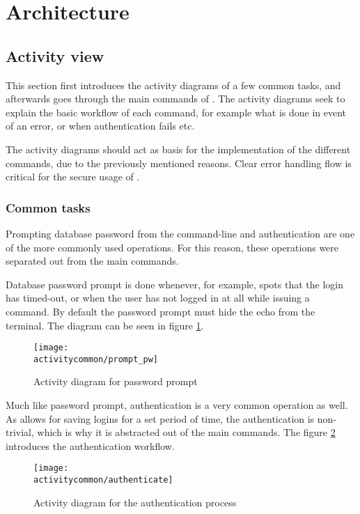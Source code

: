 \section{Architecture}

\subsection{Activity view}

This section first introduces the activity diagrams of a few common tasks, and
afterwards goes through the main commands of \pman. The activity
diagrams seek to explain the basic workflow of each command, for example what
is done in event of an error, or when authentication fails etc.

The activity diagrams should act as basis for the implementation of the different
commands, due to the previously mentioned reasons. Clear error handling flow is
critical for the secure usage of \pman.

\subsubsection{Common tasks}

Prompting database password from the command-line and authentication are one of
the more commonly used operations. For this reason, these operations were separated
out from the main commands.

Database password prompt is done whenever, for example, \pman spots that
the login has timed-out, or when the user has not logged in at all while issuing
a command. By default the password prompt must hide the echo from the terminal.
The diagram can be seen in figure \ref{dia:prompt_pw}.

\begin{figure}[H]
    \centering
    \texttt{[image: \\activitycommon/prompt\_pw]}
    \caption{Activity diagram for password prompt}
    \label{dia:prompt_pw}
\end{figure}

Much like password prompt, authentication is a very common operation as well.
As \pman allows for saving logins for a set period of time, the
authentication is non-trivial, which is why it is abstracted out of the main
commands. The figure \ref{dia:authenticate} introduces the authentication
workflow.

\begin{figure}[H]
    \centering
    \texttt{[image: \\activitycommon/authenticate]}
    \caption{Activity diagram for the authentication process}
    \label{dia:authenticate}
\end{figure}

